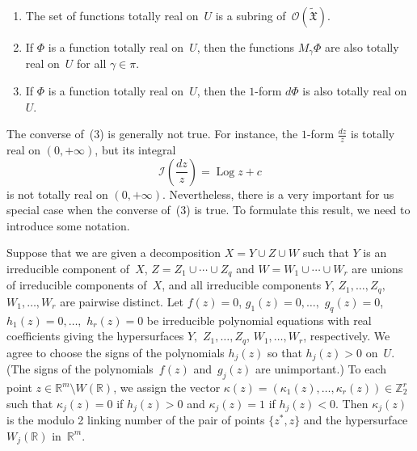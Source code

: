 \documentclass[reqno,tbtags,12pt]{amsart}
\numberwithin{equation}{section}
\newcommand{\R}{\mathbb{R}}
\newcommand{\Z}{\mathbb{Z}}
\newcommand{\tFX}{\widetilde{\mathfrak{X}}}
\newcommand{\CO}{\mathcal{O}}
\newcommand{\I}{\mathcal{I}}
\newcommand{\Log}{\mathop{\mathrm{Log}}\nolimits}
\theoremstyle{definition}
\begin{document}
\begin{enumerate}
\item The set of functions totally real on~$U$ is a subring of~$\CO(\tFX)$.
\item If $\Phi$ is a function totally real on~$U$, then the functions $M_{\gamma}\Phi$ are also totally real on~$U$ for all $\gamma\in\pi$.
\item If $\Phi$ is a function totally real on~$U$, then the $1$-form $d\Phi$ is also totally real on~$U$.
\end{enumerate}

The converse of~(3) is generally not true. For instance, the $1$-form $\frac{dz}{z}$ is totally real on $(0,+\infty)$, but its integral $$\I\left(\frac{dz}{z}\right)=\Log z+c$$ is not totally real on $(0,+\infty)$. Nevertheless, there is a very important for us special case when the converse of~(3) is true. To formulate this result, we need to introduce some notation.

Suppose that we are given a decomposition $X=Y\cup Z\cup W$ such that $Y$ is an irreducible component of~$X$, $Z=Z_1\cup\cdots\cup Z_q$ and $W=W_1\cup\cdots\cup W_r$ are unions of irreducible components of~$X$, and all irreducible components $Y$, $Z_1,\ldots, Z_q,$  $W_1,\ldots,W_r$ are pairwise distinct. Let $f(z)=0$, $g_1(z)=0,\ldots,$ $g_q(z)=0$, $h_1(z)=0,\ldots,$ $h_r(z)=0$ be  irreducible polynomial equations with real coefficients giving the hypersurfaces $Y,$ $Z_1,\ldots,Z_q$, $W_1,\ldots,W_r$, respectively. We agree to choose the signs of the polynomials $h_j(z)$ so that $h_j(z)>0$ on~$U$. (The signs of the polynomials~$f(z)$ and~$g_j(z)$ are unimportant.) 
To each point $z\in \R^m\setminus W(\R)$, we assign the vector $\kappa(z)=(\kappa_1(z),\ldots,\kappa_r(z))\in\Z_2^{r}$ such that $\kappa_j(z)=0$ if $h_j(z)>0$ and $\kappa_j(z)=1$ if $h_j(z)<0$. Then $\kappa_j(z)$ is the modulo 2 linking number of the pair of points $\{z^*,z\}$ and the hypersurface~$W_j(\R)$ in~$\R^m$. 
\end{document}
